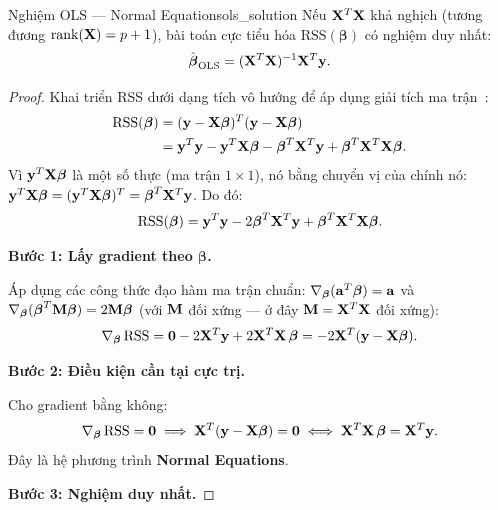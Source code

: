 \begin{mythm}{Nghiệm OLS — Normal Equations}{ols_solution}
Nếu $\mathbf{X}^T\mathbf{X}$ khả nghịch (tương đương $\operatorname{rank}(\mathbf{X}) = p+1$), bài
toán cực tiểu hóa $\mathrm{RSS}(\boldsymbol{\beta})$ có nghiệm duy nhất:
\[
    \hat{\boldsymbol{\beta}}_{\mathrm{OLS}}
    = (\mathbf{X}^T\mathbf{X})^{-1}\mathbf{X}^T\mathbf{y}.
\]
\end{mythm}

\begin{proof}
Khai triển RSS dưới dạng tích vô hướng để áp dụng giải tích ma trận~\cite{golub2013}:
\begin{align*}
    \mathrm{RSS}(\boldsymbol{\beta})
    &= (\mathbf{y} - \mathbf{X}\boldsymbol{\beta})^T
       (\mathbf{y} - \mathbf{X}\boldsymbol{\beta}) \\
    &= \mathbf{y}^T\mathbf{y}
     - \mathbf{y}^T\mathbf{X}\boldsymbol{\beta}
     - \boldsymbol{\beta}^T\mathbf{X}^T\mathbf{y}
     + \boldsymbol{\beta}^T\mathbf{X}^T\mathbf{X}\boldsymbol{\beta}.
\end{align*}
Vì $\mathbf{y}^T\mathbf{X}\boldsymbol{\beta}$ là một số thực (ma trận $1 \times 1$), nó
bằng chuyển vị của chính nó: $\mathbf{y}^T\mathbf{X}\boldsymbol{\beta} =
(\mathbf{y}^T\mathbf{X}\boldsymbol{\beta})^T = \boldsymbol{\beta}^T\mathbf{X}^T\mathbf{y}$.
Do đó:
\[
    \mathrm{RSS}(\boldsymbol{\beta})
    = \mathbf{y}^T\mathbf{y}
    - 2\boldsymbol{\beta}^T\mathbf{X}^T\mathbf{y}
    + \boldsymbol{\beta}^T\mathbf{X}^T\mathbf{X}\boldsymbol{\beta}.
\]

\medskip
\noindent\textbf{Bước 1: Lấy gradient theo $\boldsymbol{\beta}$.}

Áp dụng các công thức đạo hàm ma trận chuẩn:
$\nabla_{\boldsymbol{\beta}}(\mathbf{a}^T\boldsymbol{\beta}) = \mathbf{a}$
và $\nabla_{\boldsymbol{\beta}}(\boldsymbol{\beta}^T\mathbf{M}\boldsymbol{\beta}) = 2\mathbf{M}\boldsymbol{\beta}$
(với $\mathbf{M}$ đối xứng — ở đây $\mathbf{M} = \mathbf{X}^T\mathbf{X}$ đối xứng):
\[
    \nabla_{\boldsymbol{\beta}}\,\mathrm{RSS}
    = \mathbf{0} - 2\mathbf{X}^T\mathbf{y} + 2\mathbf{X}^T\mathbf{X}\,\boldsymbol{\beta}
    = -2\mathbf{X}^T(\mathbf{y} - \mathbf{X}\boldsymbol{\beta}).
\]

\medskip
\noindent\textbf{Bước 2: Điều kiện cần tại cực trị.}

Cho gradient bằng không:
\[
    \nabla_{\boldsymbol{\beta}}\,\mathrm{RSS} = \mathbf{0}
    \;\Longrightarrow\;
    \mathbf{X}^T(\mathbf{y} - \mathbf{X}\boldsymbol{\beta}) = \mathbf{0}
    \;\Longleftrightarrow\;
    \mathbf{X}^T\mathbf{X}\,\boldsymbol{\beta} = \mathbf{X}^T\mathbf{y}.
\]
Đây là hệ phương trình \textbf{Normal Equations}.

\medskip
\noindent\textbf{Bước 3: Nghiệm duy nhất.}


\end{proof}
